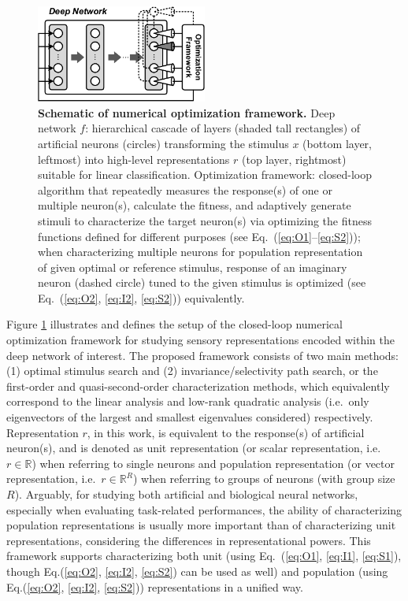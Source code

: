 \begin{figure}
\centering \includegraphics[width=0.5\textwidth]{Figs/concept.pdf} 
\caption{ 
{\bf Schematic of numerical optimization framework.} Deep network $f$: hierarchical cascade of layers (shaded tall rectangles) of artificial neurons (circles) transforming the stimulus $x$ (bottom layer, leftmost) into high-level representations $r$ (top layer, rightmost) suitable for linear classification. Optimization framework: closed-loop algorithm that repeatedly measures the response(s) of one or multiple neuron(s), calculate the fitness, and adaptively generate stimuli to characterize the target neuron(s) via optimizing the fitness functions defined for different purposes (see Eq.~(\ref{eq:O1}--\ref{eq:S2})); when characterizing multiple neurons for population representation of given optimal or reference stimulus, response of an imaginary neuron (dashed circle) tuned to the given stimulus is optimized (see Eq.~(\ref{eq:O2}, \ref{eq:I2}, \ref{eq:S2})) equivalently.}
\label{fig:concept}
\end{figure}

Figure \ref{fig:concept} illustrates and defines the setup of the closed-loop numerical optimization framework for studying sensory representations encoded within the deep network of interest. The proposed framework consists of two main methods: (1) optimal stimulus search and (2) invariance/selectivity path search, or the first-order and quasi-second-order characterization methods, which equivalently correspond to the linear analysis and low-rank quadratic analysis (i.e.~only eigenvectors of the largest and smallest eigenvalues considered) respectively. Representation $r$, in this work, is equivalent to the response(s) of artificial neuron(s), and is denoted as unit representation (or scalar representation, i.e.~$r \in \mathbb{R}$) when referring to single neurons and population representation (or vector representation, i.e.~$r \in \mathbb{R}^R$) when referring to groups of neurons (with group size $R$). Arguably, for studying both artificial and biological neural networks, especially when evaluating task-related performances, the ability of characterizing population representations is usually more important than of characterizing unit representations, considering the differences in representational powers. This framework supports characterizing both unit (using Eq.~(\ref{eq:O1}, \ref{eq:I1}, \ref{eq:S1}), though Eq.(\ref{eq:O2}, \ref{eq:I2}, \ref{eq:S2}) can be used as well) and population (using Eq.(\ref{eq:O2}, \ref{eq:I2}, \ref{eq:S2})) representations in a unified way.

